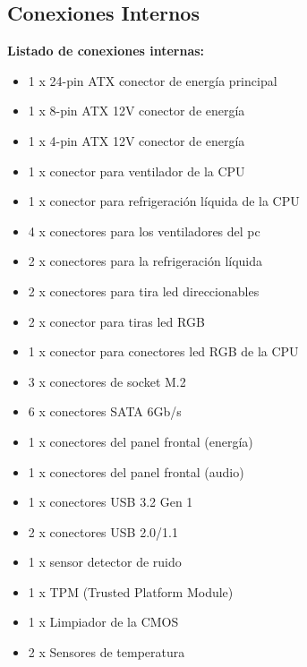 \documentclass{article}
\begin{document}
    \subsection{Conexiones Internos}
      \textbf{Listado de conexiones internas:}\\
      \normalsize
          \begin{minipage}{0.5\textwidth}
            \begin{itemize}%
              \item 1 x 24-pin ATX conector de energía principal
              \item 1 x 8-pin ATX 12V conector de energía
              \item 1 x 4-pin ATX 12V conector de energía
              \item 1 x conector para ventilador de la CPU
              \item 1 x conector para refrigeración líquida de la CPU
              \item 4 x conectores para los ventiladores del pc
              \item 2 x conectores para la refrigeración líquida
              \item 2 x conectores para tira led direccionables
              \item 2 x conector para tiras led RGB
              \item 1 x conector para conectores led RGB de la CPU
              \item 3 x conectores de socket M.2
              \item 6 x conectores SATA 6Gb/s
              \item 1 x conectores del panel frontal (energía)
              \item 1 x conectores del panel frontal (audio)
              \item 1 x conectores USB 3.2 Gen 1 
              \item 2 x conectores USB 2.0/1.1 
              \item 1 x sensor detector de ruido
              \item 1 x TPM (Trusted Platform Module)
              \item 1 x Limpiador de la  CMOS
              \item 2 x Sensores de temperatura
            \end{itemize}
          \end{minipage}
\end{document}

